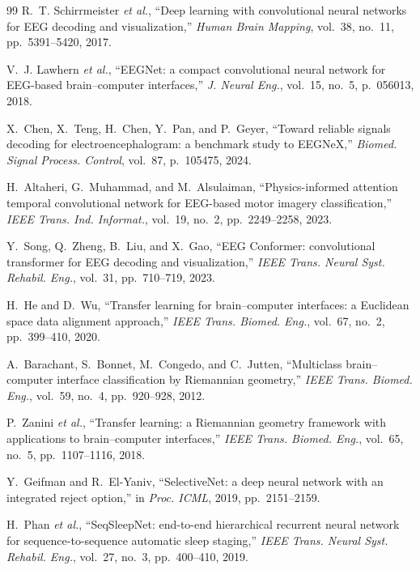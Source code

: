 \documentclass[conference]{IEEEtran}
\begin{document}
\begin{thebibliography}{99}
 R.~T. Schirrmeister \emph{et al.}, ``Deep learning with
convolutional neural networks for EEG decoding and visualization,'' \emph{Human
Brain Mapping}, vol.~38, no.~11, pp.~5391--5420, 2017.

 V.~J. Lawhern \emph{et al.}, ``EEGNet: a compact convolutional
neural network for EEG-based brain--computer interfaces,'' \emph{J. Neural Eng.},
vol.~15, no.~5, p.~056013, 2018.

 X.~Chen, X.~Teng, H.~Chen, Y.~Pan, and P.~Geyer, ``Toward
reliable signals decoding for electroencephalogram: a benchmark study to
EEGNeX,'' \emph{Biomed. Signal Process. Control}, vol.~87, p.~105475, 2024.

 H.~Altaheri, G.~Muhammad, and M.~Alsulaiman,
``Physics-informed attention temporal convolutional network for EEG-based motor
imagery classification,'' \emph{IEEE Trans. Ind. Informat.}, vol.~19, no.~2,
pp.~2249--2258, 2023.

 Y.~Song, Q.~Zheng, B.~Liu, and X.~Gao, ``EEG Conformer:
convolutional transformer for EEG decoding and visualization,'' \emph{IEEE Trans.
Neural Syst. Rehabil. Eng.}, vol.~31, pp.~710--719, 2023.

 H.~He and D.~Wu, ``Transfer learning for brain--computer
interfaces: a Euclidean space data alignment approach,'' \emph{IEEE Trans.
Biomed. Eng.}, vol.~67, no.~2, pp.~399--410, 2020.

 A.~Barachant, S.~Bonnet, M.~Congedo, and C.~Jutten,
``Multiclass brain--computer interface classification by Riemannian geometry,''
\emph{IEEE Trans. Biomed. Eng.}, vol.~59, no.~4, pp.~920--928, 2012.

 P.~Zanini \emph{et al.}, ``Transfer learning: a Riemannian
geometry framework with applications to brain--computer interfaces,'' \emph{IEEE
Trans. Biomed. Eng.}, vol.~65, no.~5, pp.~1107--1116, 2018.

 Y.~Geifman and R.~El-Yaniv, ``SelectiveNet: a deep neural
network with an integrated reject option,'' in \emph{Proc. ICML}, 2019,
pp.~2151--2159.

 H.~Phan \emph{et al.}, ``SeqSleepNet: end-to-end
hierarchical recurrent neural network for sequence-to-sequence automatic sleep
staging,'' \emph{IEEE Trans. Neural Syst. Rehabil. Eng.}, vol.~27, no.~3,
pp.~400--410, 2019.


\end{thebibliography}
\end{document}
